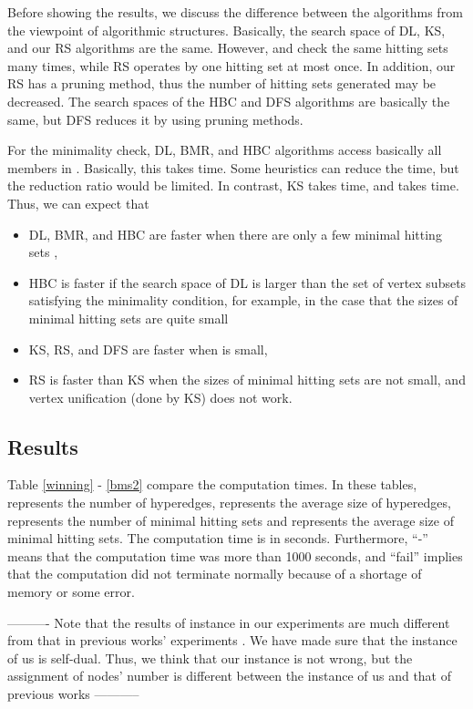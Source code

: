 Before showing the results, we discuss the difference between the algorithms
 from the viewpoint of algorithmic structures.
Basically, the search space of DL, KS, and our RS algorithms are the same.
 However,  and  check the same hitting sets many times, 
 while RS operates by one hitting set at most once.
In addition, our RS has a pruning method, thus the number of hitting sets
 generated may be decreased.
The search spaces of the HBC and DFS algorithms are basically the same,
 but DFS reduces it by using pruning methods.

For the minimality check, DL, BMR, and HBC algorithms access basically all
 members in .
Basically, this takes  time.
Some heuristics can reduce the time, but the reduction ratio would be limited.
In contrast, KS takes  time, and  takes
  time.
Thus, we can expect that

\begin{itemize}
\item DL, BMR, and HBC are faster when there are only a few minimal hitting
 sets ,\\
\item HBC is faster if the search space of DL is larger than the set of
 vertex subsets satisfying the minimality condition, for example, in the
 case that the sizes of minimal hitting sets are quite small\\
\item KS, RS, and DFS are faster when  is small,\\
\item RS is faster than KS when the sizes of minimal hitting sets are not
 small, and vertex unification (done by KS) does not work.
\end{itemize}

\subsection{Results}

Table \ref{winning} - \ref{bms2} compare the computation times.
In these tables,  represents the number of hyperedges,
  represents the average size of hyperedges, 
 represents the number of minimal hitting sets and  represents
 the average size of minimal hitting sets.
The computation time is in seconds.
Furthermore, ``-'' means that the computation time was more than 1000 seconds,
 and ``fail'' implies that the computation did not terminate normally 
 because of a shortage of memory or some error.

----------
Note that the results of instance  in our experiments are much
different from that in previous works' experiments \cite{KvSt05,BeEk03}.
We have made sure that the instance  of us is self-dual.
Thus, we think that our instance is not wrong, but
the assignment of nodes' number is different between the instance  of us and that of previous works
-----------
\fi


